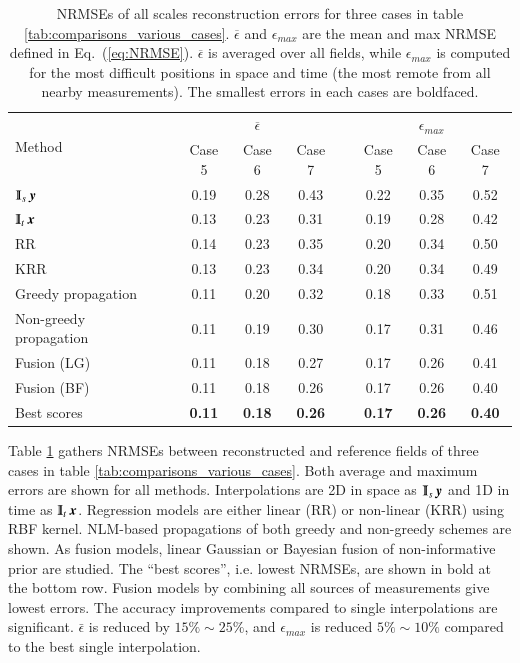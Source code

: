 \begin{table}
\caption{\label{tab:comparisons_results}
NRMSEs of all scales reconstruction errors for three cases in table \ref{tab:comparisons_various_cases}. $\overline{\epsilon}$ and $\epsilon_{max}$ are the mean and max NRMSE defined in Eq.~(\ref{eq:NRMSE}). $\overline{\epsilon}$ is averaged over all fields, while $\epsilon_{max}$ is computed for the most difficult positions in space and time (the most remote from all nearby measurements). The smallest errors in each cases are boldfaced.}
\vspace{.5cm}
\centering
	\begin{tabular}{lcccccccc} 
		\toprule \multirow{2}{*}{Method}&\multicolumn{1}{c}{}&\multicolumn{3}{c}{$\overline{\epsilon}$}&\multicolumn{1}{c}{}&\multicolumn{3}{c}{$\epsilon_{max}$}\\
		\cmidrule{3-5} \cmidrule{7-9}
		 & & {Case 5} & {Case 6} & {Case 7} & & {Case 5} & {Case 6} & {Case 7}\\
		\midrule 
		$ \Interp_s \y $ & & 0.19 & 0.28 & 0.43 & & 0.22 & 0.35 &  0.52 \\ 
		$ \Interp_t \x $ & & 0.13 & 0.23 & 0.31 & & 0.19 & 0.28 &  0.42 \\ 	\midrule 
		RR & & 0.14 & 0.23 & 0.35 & & 0.20 & 0.34 &  0.50 \\
		KRR & & 0.13 & 0.23 & 0.34 & & 0.20 & 0.34 &  0.49 \\ 	\midrule 
		Greedy propagation & & 0.11 & 0.20 & 0.32 & & 0.18 & 0.33 &  0.51 \\
		Non-greedy propagation & & 0.11 & 0.19 & 0.30 & & 0.17 & 0.31 &  0.46 \\	
		Fusion (LG)  & & 0.11 & 0.18 & 0.27 & & 0.17 &  0.26 &  0.41 \\
    	Fusion (BF)  & & 0.11 & 0.18 & 0.26 & & 0.17 &  0.26 &  0.40 \\ \midrule 
    	\myrowcolour
    	Best scores  & & \textbf{0.11} & \textbf{0.18} & \textbf{0.26} & & \textbf{0.17} &  \textbf{0.26} &  \textbf{0.40} \\ \bottomrule
	\end{tabular}
\end{table}

Table \ref{tab:comparisons_results} gathers NRMSEs between reconstructed and reference fields of three cases in table \ref{tab:comparisons_various_cases}. Both average and maximum errors are shown for all methods. Interpolations are 2D in space as $ \Interp_s \y $ and 1D in time as $ \Interp_t \x $. Regression models are either linear (RR) or non-linear (KRR) using RBF kernel. NLM-based propagations of both greedy and non-greedy schemes are shown. As fusion models, linear Gaussian or Bayesian fusion of non-informative prior are studied. The ``best scores'', i.e. lowest NRMSEs, are shown in bold at the bottom row. Fusion models by combining all sources of measurements give lowest errors. The accuracy improvements compared to single interpolations are significant. $ \bar{\epsilon} $ is reduced by $ 15 \% \sim 25\% $, and $ \epsilon_{max} $ is reduced $ 5\% \sim 10\%$ compared to the best single interpolation. 

